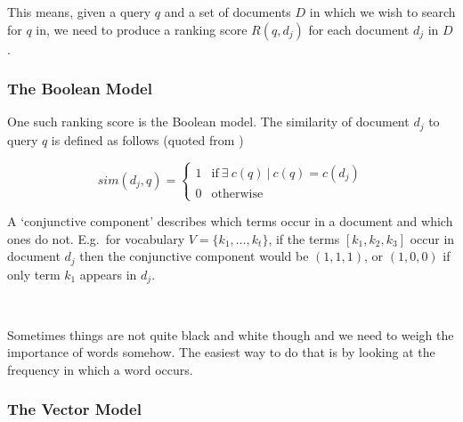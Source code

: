 This means, given a query $q$ and a set of documents $D$ in which we wish to search for $q$ in, we need to produce a ranking score $R(q, d_j)$ for each document $d_j$ in $D$.



\subsubsection{The Boolean Model}

One such ranking score is the Boolean model. The similarity of document $d_j$ to query $q$ is defined as follows (quoted from \autocite[p.65]{Baeza-Yates2011})

\begin{equation}
  sim(d_j,q) =
  \begin{cases}
  1 & \text{if} \ \exists \ c(q) \ | \ c(q) = c(d_j)\\
  0 & \text{otherwise}
  \end{cases}
  \label{eq:sim}
\end{equation}

A `conjunctive component' describes which terms occur in a document and which ones do not. E.g.\ for vocabulary $V =\{k_{1},\ldots, k_{t}\}$, if the terms $[ k_{1},k_{2},k_{3}]$ occur in document $d_{j}$ then the conjunctive component would be $(1,1,1)$, or $(1,0,0)$ if only term $k_{1}$ appears in $d_{j}$.


\\

Sometimes things are not quite black and white though and we need to weigh the importance of words somehow. The easiest way to do that is by looking at the frequency in which a word occurs.



\subsubsection{The Vector Model}

